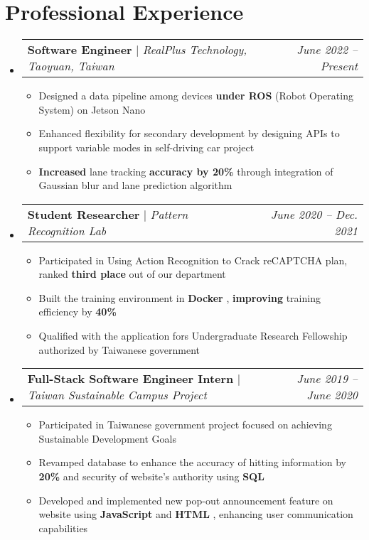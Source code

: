 \documentclass[letterpaper,11pt]{article}
\makeatletter
\newcommand{\HL}[1]{
  \textbf{\textcolor{DukeBlue}{#1}}
}
\newcommand{\subheadingtitlevspace}{
\vspace{-3pt}
}
\newcommand{\resumeItem}[1]{
  \item{
    {#1 \vspace{-4pt}}
  }
}
\newcommand{\titleItem}[1]{
  \textbf{#1}
}
\newcommand{\resumeProjectHeading}[2]{
    \item
    \begin{tabular*}{0.97\textwidth}{l@{\extracolsep{\fill}}r}
      #1 & \textit{ #2} \\
    \end{tabular*}\vspace{-9pt}
}
\newcommand{\resumeSubHeadingListStart}{\subheadingtitlevspace\begin{itemize}[leftmargin=0.15in, label={}]}
\newcommand{\resumeSubHeadingListEnd}{\end{itemize}}
\newcommand{\resumeItemListStart}{
\begin{itemize}}
\newcommand{\resumeItemListEnd}{
\end{itemize}\vspace{-8pt}}
\makeatother
\begin{document}
\section{Professional Experience}
  \resumeSubHeadingListStart
    \resumeProjectHeading
      {\titleItem{{Software Engineer}} $|$ \emph{RealPlus Technology, Taoyuan, Taiwan}}{June 2022 -- Present}
    \resumeItemListStart
      \resumeItem{Designed a data pipeline among devices \HL{under ROS} (Robot Operating System) on Jetson Nano }
      \resumeItem{Enhanced flexibility for secondary development by designing APIs to support variable modes in self-driving car project }
      \resumeItem{\HL{Increased} lane tracking \HL{accuracy by 20\%} through integration of Gaussian blur and lane prediction algorithm}
    \resumeItemListEnd
    \resumeProjectHeading
      {\titleItem{{Student Researcher}}$|$ \emph{Pattern Recognition Lab}}{June 2020 -- Dec. 2021}
    \resumeItemListStart
      \resumeItem{Participated in Using Action Recognition to Crack reCAPTCHA plan, ranked \HL{third place} out of our department}
      \resumeItem{Built the training environment in \HL{Docker}, \HL{improving} training efficiency by \HL{40\%}}
      \resumeItem{Qualified with the application fors Undergraduate Research Fellowship authorized by Taiwanese government}
    \resumeItemListEnd
    \resumeProjectHeading
      {\titleItem{{Full-Stack Software Engineer Intern}}$|$ \emph{Taiwan Sustainable Campus Project} }{June 2019 -- June 2020}
    \resumeItemListStart
      \resumeItem{Participated in Taiwanese government project focused on achieving Sustainable Development Goals}
      \resumeItem{Revamped database to enhance the accuracy of hitting information by \HL{20\%} and security of website’s authority using \HL{SQL}}
      \resumeItem{Developed and implemented new pop-out announcement feature on website using \HL{JavaScript} and \HL{HTML}, enhancing user communication capabilities}
    \resumeItemListEnd
  \resumeSubHeadingListEnd

\end{document}
